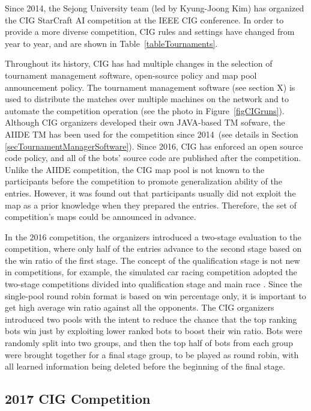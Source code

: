 Since 2014, the Sejong University team (led by Kyung-Joong Kim) has organized the CIG StarCraft AI competition at the IEEE CIG conference. In order to provide a more diverse competition, CIG rules and settings have changed from year to year, and are shown in Table~\ref{tableTournaments}. 

Throughout its history, CIG has had multiple changes in the selection of tournament management software, open-source policy and map pool announcement policy. The tournament management software (see section X) is used to distribute the matches over multiple machines on the network and to automate the competition operation (see the photo in Figure~\ref{figCIGruns}). Although CIG organizers developed their own JAVA-based TM sofware, the AIIDE TM has been used for the competition since 2014~(see details in Section \ref{secTournamentManagerSoftware}). Since 2016, CIG has enforced an open source code policy, and all of the bots' source code are published after the competition. Unlike the AIIDE competition, the CIG map pool is not known to the participants before the competition to promote generalization ability of the entries. However, it was found out that participants usually did not exploit the map as a prior knowledge when they prepared the entries. Therefore, the set of competition's maps could be announced in advance. 
 
In the 2016 competition, the organizers introduced a two-stage evaluation to the competition, where only half of the entries advance to the second stage based on the win ratio of the first stage. The concept of the qualification stage is not new in competitions, for example, the simulated car racing competition adopted the two-stage competitions divided into qualification stage and main race \cite{loiacono20102009}. Since the single-pool round robin format is based on win percentage only, it is important to get high average win ratio against all the opponents. The CIG organizers introduced two pools with the intent to reduce the chance that the top ranking bots win just by exploiting lower ranked bots to boost their win ratio. Bots were randomly split into two groups, and then the top half of bots from each group were brought together for a final stage group, to be played as round robin, with all learned information being deleted before the beginning of the final stage. 

\subsection{2017 CIG Competition}\label{subsecCIGnews}

